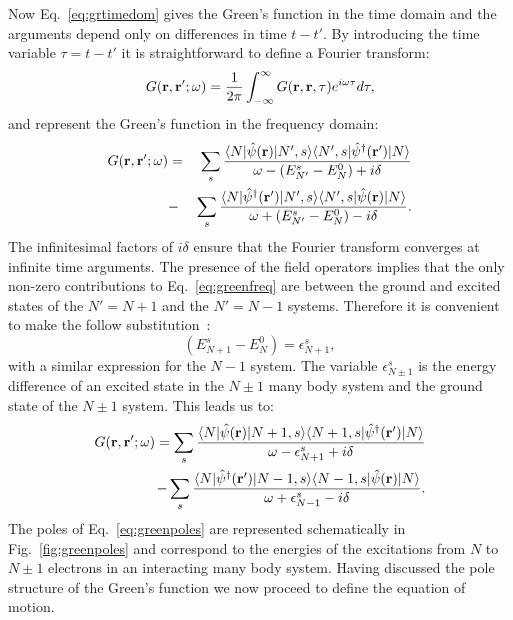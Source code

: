 %
Now Eq.~\ref{eq:grtimedom} gives the Green's function in the time domain and the arguments depend 
only on differences in time $t-t'$. By introducing the time variable $\tau = t-t'$ it is 
straightforward to define a Fourier transform:
%
\begin{equation}
G({\bf r},{\bf r}';\omega) = \frac{1}{2\pi} \int_{-\infty}^{\infty} G({\bf r},{\bf r},\tau) e^{i\omega\tau} d\tau,
\end{equation}
%
and represent the Green's function in the frequency domain:
%
\begin{eqnarray}
\label{eq:greenfreq}
G({\bf r},{\bf r^\prime};\omega) & = &\sum_{s} \frac{\langle N|\hat{\psi}({\bf r}) |N',s\rangle \langle N',s|\hat{\psi}^{\dagger}({\bf r}')| N \rangle}{\omega - (E^{s}_{N'} - E^{0}_{N}) + i\delta} \nonumber \\
	  		   & - & \sum_{s}\frac{\langle N|\hat{\psi}^{\dagger}({\bf r}') |N',s\rangle \langle N',s|\hat{\psi}({\bf r})| N \rangle}{\omega + (E^{s}_{N'} - E^{0}_{N}) - i\delta}.
\end{eqnarray}
%
The infinitesimal factors of $i\delta$ ensure that the Fourier 
transform converges at infinite time arguments.
The presence of the field operators implies that the only 
non-zero contributions to Eq.~\ref{eq:greenfreq} are between 
the ground and excited states of the $N'=N+1$ and the $N'=N-1$ systems. 
Therefore it is convenient to make the follow substitution~\cite{inkson}:
%
\begin{equation}
(E^{s}_{N+1} - E^{0}_{N}) = \epsilon^{s}_{N+1},
\end{equation}
%
with a similar expression for the $N-1$ system. The variable $\epsilon^{s}_{N\pm1}$ 
is the energy difference of an excited state in the $N\pm1$ many body system and 
the ground state of the $N\pm1$ system. 
This leads us to:
%
\begin{eqnarray}
\label{eq:greenpoles}
G({\bf r},{\bf r^\prime};\omega) = \sum_{s} \frac{\langle N|\hat{\psi}({\bf r}) |N+1,s\rangle \langle N+1,s|\hat{\psi}^{\dagger}({\bf r}')| N \rangle}{\omega - \epsilon^{s}_{N+1} + i\delta} \nonumber \\
			 		-\sum_{s} \frac{\langle N|\hat{\psi}^{\dagger}({\bf r}')|N-1,s\rangle \langle N-1,s|\hat{\psi}({\bf r})| N \rangle}{\omega + \epsilon^{s}_{N-1} - i\delta}.
\end{eqnarray}
%
The poles of Eq.~\ref{eq:greenpoles} are represented schematically in Fig.~\ref{fig:greenpoles} 
and correspond to the energies of the excitations from $N$ to $N\pm1$ electrons 
in an interacting many body system. Having discussed the pole structure of 
the Green's function we now proceed to define the equation of motion.

